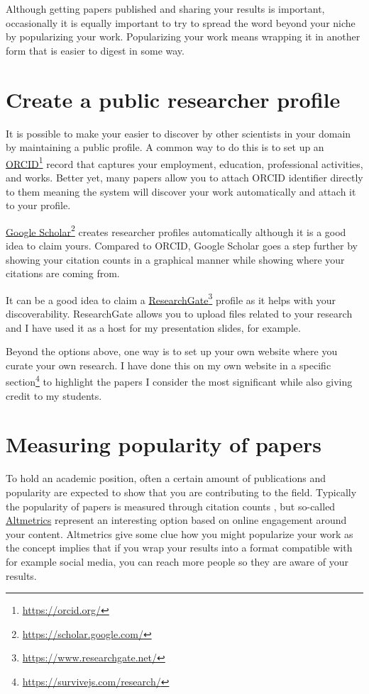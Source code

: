 Although getting papers published and sharing your results is important, occasionally it is equally important to try to spread the word beyond your niche by popularizing your work.
Popularizing your work means wrapping it in another form that is easier to digest in some way.

\section{Create a public researcher profile}

It is possible to make your easier to discover by other scientists in your domain by maintaining a public profile.
A common way to do this is to set up an \href{https://orcid.org/}{ORCID}\footnote{\url{https://orcid.org/}} record that captures your employment, education, professional activities, and works.
Better yet, many papers allow you to attach ORCID identifier directly to them meaning the system will discover your work automatically and attach it to your profile.

\href{https://scholar.google.com/}{Google Scholar}\footnote{\url{https://scholar.google.com/}} creates researcher profiles automatically although it is a good idea to claim yours.
Compared to ORCID, Google Scholar goes a step further by showing your citation counts in a graphical manner while showing where your citations are coming from.

It can be a good idea to claim a \href{https://www.researchgate.net/}{ResearchGate}\footnote{\url{https://www.researchgate.net/}} profile as it helps with your discoverability.
ResearchGate allows you to upload files related to your research and I have used it as a host for my presentation slides, for example.

Beyond the options above, one way is to set up your own website where you curate your own research.
I have done this on my own website in a specific section\footnote{\url{https://survivejs.com/research/}} to highlight the papers I consider the most significant while also giving credit to my students.

\section{Measuring popularity of papers}

To hold an academic position, often a certain amount of publications and popularity are expected to show that you are contributing to the field.
Typically the popularity of papers is measured through citation counts \citep{zhou2012quantifying}, but so-called \href{https://www.altmetric.com/}{Altmetrics} represent an interesting option based on online engagement around your content.
Altmetrics give some clue how you might popularize your work as the concept implies that if you wrap your results into a format compatible with for example social media, you can reach more people so they are aware of your results.

